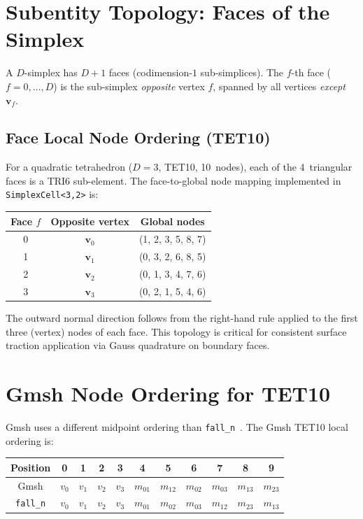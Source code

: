 \section{Subentity Topology: Faces of the Simplex}
\label{sec:faces}

A $D$-simplex has $D+1$ faces (codimension-$1$ sub-simplices).  The $f$-th face
($f = 0, \dots, D$) is the sub-simplex \emph{opposite} vertex $f$, spanned by
all vertices \emph{except} $\mathbf{v}_f$.

\subsection{Face Local Node Ordering (TET10)}

For a quadratic tetrahedron ($D=3$, TET10, 10~nodes), each of the 4~triangular
faces is a TRI6 sub-element.  The face-to-global node mapping implemented in
\texttt{SimplexCell<3,2>} is:

\begin{center}
\begin{tabular}{ccc}
  \toprule
  Face $f$ & Opposite vertex & Global nodes \\
  \midrule
  0 & $\mathbf{v}_0$ & (1, 2, 3, 5, 8, 7) \\
  1 & $\mathbf{v}_1$ & (0, 3, 2, 6, 8, 5) \\
  2 & $\mathbf{v}_2$ & (0, 1, 3, 4, 7, 6) \\
  3 & $\mathbf{v}_3$ & (0, 2, 1, 5, 4, 6) \\
  \bottomrule
\end{tabular}
\end{center}

The outward normal direction follows from the right-hand rule applied to the
first three (vertex) nodes of each face.  This topology is critical for
consistent surface traction application via Gauss quadrature on boundary faces.


\section{Gmsh Node Ordering for TET10}
\label{sec:gmsh_reorder}

Gmsh uses a different midpoint ordering than
\texttt{fall\_n}~\cite{Geuzaine2009}.  The Gmsh TET10 local ordering is:

\begin{center}
\begin{tabular}{ccccccccccc}
  \toprule
  Position & 0 & 1 & 2 & 3 & 4 & 5 & 6 & 7 & 8 & 9 \\
  \midrule
  Gmsh     & $v_0$ & $v_1$ & $v_2$ & $v_3$ & $m_{01}$ & $m_{12}$ & $m_{02}$ & $m_{03}$ & $m_{13}$ & $m_{23}$ \\
  \texttt{fall\_n} & $v_0$ & $v_1$ & $v_2$ & $v_3$ & $m_{01}$ & $m_{02}$ & $m_{03}$ & $m_{12}$ & $m_{23}$ & $m_{13}$ \\
  \bottomrule
\end{tabular}
\end{center}

